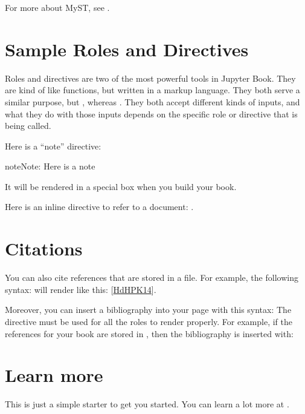 \documentclass[letterpaper,10pt,english]{jupyterBook}
\begin{document}
\sphinxAtStartPar
For more about MyST, see .


\section{Sample Roles and Directives}
\label{\detokenize{markdown:sample-roles-and-directives}}
\sphinxAtStartPar
Roles and directives are two of the most powerful tools in Jupyter Book. They
are kind of like functions, but written in a markup language. They both
serve a similar purpose, but , whereas
. They both accept different kinds of inputs,
and what they do with those inputs depends on the specific role or directive
that is being called.

\sphinxAtStartPar
Here is a “note” directive:

\begin{sphinxadmonition}{note}{Note:}
\sphinxAtStartPar
Here is a note
\end{sphinxadmonition}

\sphinxAtStartPar
It will be rendered in a special box when you build your book.

\sphinxAtStartPar
Here is an inline directive to refer to a document: {\hyperref[\detokenize{markdown-notebooks::doc}]{}}.


\section{Citations}
\label{\detokenize{markdown:citations}}
\sphinxAtStartPar
You can also cite references that are stored in a  file. For example,
the following syntax:  will render like
this: {[}\hyperlink{cite.markdown:id3}{HdHPK14}{]}.

\sphinxAtStartPar
Moreover, you can insert a bibliography into your page with this syntax:
The  directive must be used for all the  roles to
render properly.
For example, if the references for your book are stored in ,
then the bibliography is inserted with:


\section{Learn more}
\label{\detokenize{markdown:learn-more}}
\sphinxAtStartPar
This is just a simple starter to get you started.
You can learn a lot more at .
\end{document}
